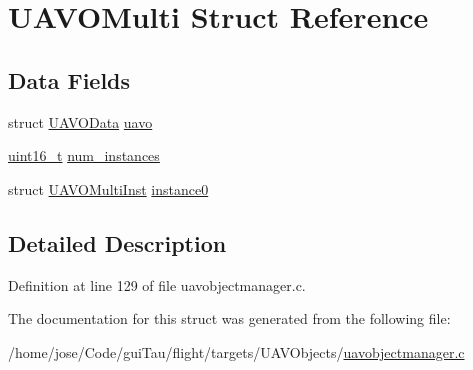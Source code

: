 \hypertarget{struct_u_a_v_o_multi}{\section{U\-A\-V\-O\-Multi Struct Reference}
\label{struct_u_a_v_o_multi}
}
\subsection*{Data Fields}
\begin{DoxyCompactItemize}
\item 
struct \hyperlink{struct_u_a_v_o_data}{U\-A\-V\-O\-Data} \hyperlink{group___u_a_v_ga718e24f6eadeb8508309dcb0eeeb9bda}{uavo}
\item 
\hyperlink{stdint_8h_a273cf69d639a59973b6019625df33e30}{uint16\-\_\-t} \hyperlink{group___u_a_v_ga9502c6a24b6d21d6ec4e48fbe166f1c4}{num\-\_\-instances}
\item 
struct \hyperlink{struct_u_a_v_o_multi_inst}{U\-A\-V\-O\-Multi\-Inst} \hyperlink{group___u_a_v_ga2512d4c2267924e345079a69ae78b209}{instance0}
\end{DoxyCompactItemize}


\subsection{Detailed Description}


Definition at line 129 of file uavobjectmanager.\-c.



The documentation for this struct was generated from the following file\-:\begin{DoxyCompactItemize}
\item 
/home/jose/\-Code/gui\-Tau/flight/targets/\-U\-A\-V\-Objects/\hyperlink{uavobjectmanager_8c}{uavobjectmanager.\-c}\end{DoxyCompactItemize}
